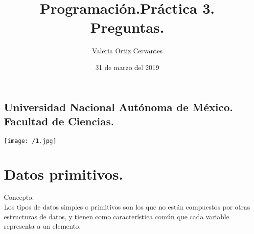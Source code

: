 \documentclass{article}
\title{\Huge Programación.}
\author{\huge Valeria Ortiz Cervantes}
\date{31 de marzo del 2019}
\begin{document}
\maketitle
\begin{center}
	\subsection*{\LARGE Universidad Nacional Autónoma de México.\\Facultad de Ciencias.\\}
	\texttt{[image: /1.jpg]}
\end{center}
\newpage
\begin{center}
	\title{\LARGE Práctica 3. Preguntas.}
\end{center}
\section*{Datos primitivos.}
Concepto:\\Los tipos de datos simples o primitivos son los que no están compuestos por otras estructuras de datos, y tienen como característica común que cada variable representa a un elemento.
\end{document}
